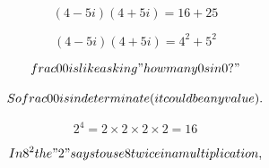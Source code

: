 \[(4 - 5i)(4 + 5i) = 16 + 25\]

\[(4 - 5i)(4 + 5i) = 4^{2} + 5^{2}\]

\[\\frac{0}{0} is like asking "how many 0s in 0?"\]

\[So \\frac{0}{0} is indeterminate (it could be any value).\]

\[2^{4} = 2 \times 2 \times 2 \times 2 = 16\]

\[In 8^{2} the "2" says to use 8 twice in a multiplication,\]

